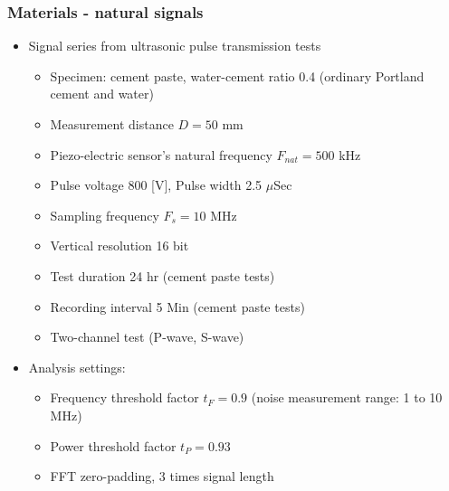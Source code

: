 \documentclass[11pt,aspectratio=169]{beamer}
\begin{document}
	\begin{frame}
		\frametitle{Materials - natural signals}
		\begin{itemize}
			\item \textcolor{RIPtitlecol}{Signal series from ultrasonic pulse transmission tests}
			\begin{itemize}
				\item Specimen: cement paste, water-cement ratio 0.4 (ordinary Portland cement and water)
				\item Measurement distance $D = 50$ mm
				\item Piezo-electric sensor's natural frequency $F_{nat} = 500$ kHz
				\item Pulse voltage 800 [V], Pulse width 2.5 $\mu$Sec
				\item Sampling frequency $F_s = 10$ MHz
				\item Vertical resolution 16 bit
				\item Test duration 24 hr (cement paste tests)
				\item Recording interval 5 Min (cement paste tests)
				\item Two-channel test (P-wave, S-wave)
			\end{itemize}
			\item \textcolor{RIPtitlecol}{Analysis settings:}
			\begin{itemize}
				\item Frequency threshold factor $t_F = 0.9$ (noise measurement range: 1 to 10 MHz)
				\item Power threshold factor $t_P = 0.93$
				\item FFT zero-padding, 3 times signal length
			\end{itemize}
		\end{itemize}	
	\end{frame}
\end{document}
